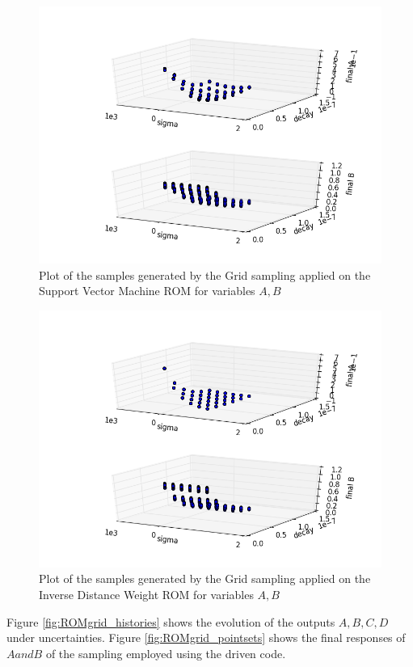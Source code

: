  \begin{figure}[h!]
  \centering
  \includegraphics[scale=0.7]{pics/samplesPlot3DROMsvm_scatter-scatter.png}
  \caption{Plot of the samples generated by the Grid sampling applied on the Support Vector Machine ROM for variables $A,B$}
  \label{fig:ROMsvm_samples}
 \end{figure}
 \begin{figure}[h!]
  \centering
  \includegraphics[scale=0.7]{pics/samplesPlot3DROMinverse_scatter-scatter.png}
  \caption{Plot of the samples generated by the Grid sampling applied on the Inverse Distance Weight ROM for variables $A,B$}
  \label{fig:ROMinverse_samples}
 \end{figure}
 Figure \ref{fig:ROMgrid_histories} 
 shows the evolution of the outputs $A,B,C,D$ under uncertainties. 
 Figure \ref{fig:ROMgrid_pointsets} shows the final responses  of $A and B$
 of the sampling employed using the driven code. 

